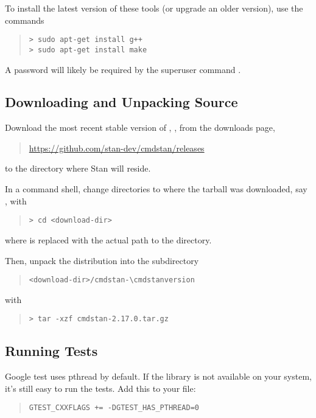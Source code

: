 To install the latest version of these
tools (or upgrade an older version), use the commands
%
\begin{quote}
\begin{Verbatim}[fontshape=sl,fontsize=\small]
> sudo apt-get install g++ 
> sudo apt-get install make 
\end{Verbatim}
\end{quote}
% 
A password will likely be required by the superuser command .


\subsection{Downloading and Unpacking \CmdStan Source}

Download the most recent stable version of \CmdStan,
, from the \CmdStan downloads page,
%
\begin{quote}
\url{https://github.com/stan-dev/cmdstan/releases}
\end{quote}
%
to the directory where Stan will reside.

In a command shell, change directories to where the tarball was
downloaded, say , with
%
\begin{quote}
\begin{Verbatim}[fontshape=sl,fontsize=\small]
> cd <download-dir>
\end{Verbatim}
\end{quote}
%
where  is replaced with the actual path to the directory.

Then, unpack the distribution into the subdirectory
\begin{quote}
\nolinkurl{<download-dir>/cmdstan-\cmdstanversion}
\end{quote}
%
with
%
\begin{quote}
\begin{Verbatim}[fontshape=sl,fontsize=\small]
> tar -xzf cmdstan-2.17.0.tar.gz
\end{Verbatim}
\end{quote}

\subsection{Running \CmdStan Tests}

Google test uses pthread by default. If the library is not available on your
system, it's still easy to run the tests. Add this to your 
file:
\begin{quote}
\begin{Verbatim}[fontshape=sl,fontsize=\small]
GTEST_CXXFLAGS += -DGTEST_HAS_PTHREAD=0
\end{Verbatim}
\end{quote}





